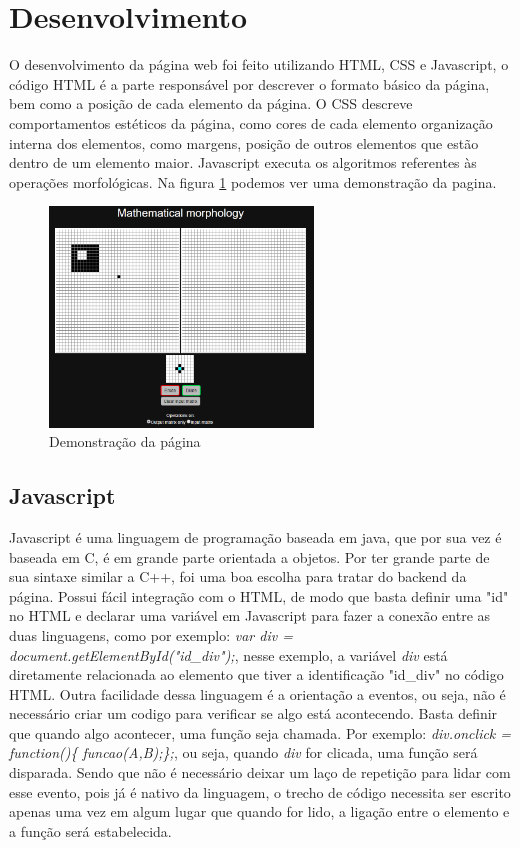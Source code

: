 \documentclass[conference,harvard,brazil,english]{sbatex}
\begin{document}
\section{Desenvolvimento}
O desenvolvimento da página web foi feito utilizando HTML, CSS e Javascript, o código HTML é a parte responsável por descrever o formato básico da página, bem como a posição de cada elemento da página. O CSS descreve comportamentos estéticos da página, como cores de cada elemento organização interna dos elementos, como margens, posição de outros elementos que estão dentro de um elemento maior. Javascript executa os algoritmos referentes às operações morfológicas. Na figura \ref{pagina} podemos ver uma demonstração da pagina.

\begin{figure}[ht]
\centering
\includegraphics[width=7cm]{body.png}
\caption{Demonstração da página}
\label{pagina}
\end{figure}

\subsection{Javascript}
Javascript é uma linguagem de programação baseada em java, que por sua vez é baseada em C, é em grande parte orientada a objetos. Por ter grande parte de sua sintaxe similar a C++, foi uma boa escolha para tratar do backend da página. Possui fácil integração com o HTML, de modo que basta definir uma "id" no HTML e declarar uma variável em Javascript para fazer a conexão entre as duas linguagens, como por exemplo: 
\textit{var div = document.getElementById("id\_div");}, nesse exemplo, a variável \textit{div} está diretamente relacionada ao elemento que tiver a identificação "id\_div" no código HTML. Outra facilidade dessa linguagem é a orientação a eventos, ou seja, não é necessário criar um codigo para verificar se algo está acontecendo. Basta definir que quando algo acontecer, uma função seja chamada.
Por exemplo: \textit{div.onclick =  function()\{ funcao(A,B);\};}, ou seja, quando \textit{div} for clicada, uma função será disparada. Sendo que não é necessário deixar um laço de repetição para lidar com esse evento, pois já é nativo da linguagem, o trecho de código necessita ser escrito apenas uma vez em algum lugar que quando for lido, a ligação entre o elemento e a função será estabelecida.
\end{document}
